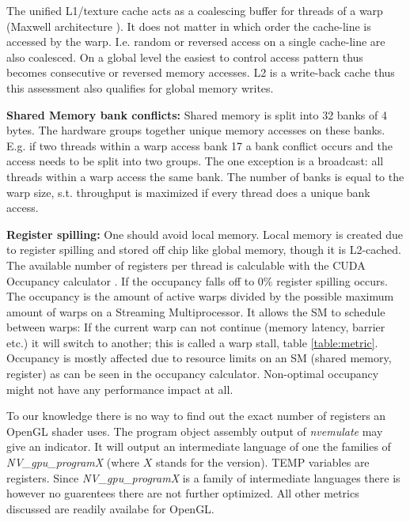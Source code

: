 \documentclass[m,times]{cgMA}
\begin{document}
The unified L1/texture cache acts as a coalescing buffer for threads of a warp (Maxwell architecture \cite{NVIDIA:MAXWELL}). It does not matter in which order the cache-line is accessed by the warp. I.e. random or reversed access on a single cache-line are also coalesced. On a global level the easiest to control access pattern thus becomes consecutive or reversed memory accesses. L2 is a write-back cache thus this assessment also qualifies for global memory writes. \cite{NVIDIA:MEMORY_BAND}


\textbf{Shared Memory bank conflicts:} Shared memory is split into 32 banks of 4 bytes. The hardware groups together unique memory accesses on these banks. E.g. if two threads within a warp access bank 17 a bank conflict occurs and the access needs to be split into two groups. The one exception is a broadcast: all threads within a warp access the same bank. The number of banks is equal to the warp size, s.t. throughput is maximized if every thread does a unique bank access. \cite{NVIDIA:BEST:PRACTICE}


\textbf{Register spilling:} One should avoid local memory. Local memory is created due to register spilling and stored off chip like global memory, though it is L2-cached. The available number of registers per thread is calculable with the CUDA Occupancy calculator \cite{NVIDIA:OCCUPANCY}. If the occupancy falls off to 0\% register spilling occurs. The occupancy is the amount of active warps divided by the possible maximum amount of warps on a Streaming Multiprocessor. It allows the SM to schedule between warps: If the current warp can not continue (memory latency, barrier etc.) it will switch to another; this is called a warp stall, table \ref{table:metric}. Occupancy is mostly affected due to resource limits on an SM (shared memory, register) as can be seen in the occupancy calculator. Non-optimal occupancy might not have any performance impact at all. \cite{NVIDIA:ACHIEVED_OCCUPANCY}

To our knowledge there is no way to find out the exact number of registers an OpenGL shader uses. The program object assembly output of \textit{nvemulate} \cite{NVIDIA:EMULATE} may give an indicator. It will output an intermediate language of one the families of \textit{NV\_gpu\_programX} (where $X$ stands for the version). TEMP variables are registers. Since \textit{NV\_gpu\_programX} is a family of intermediate languages there is however no guarentees there are not further optimized. All other metrics discussed are readily availabe for OpenGL.
\end{document}

